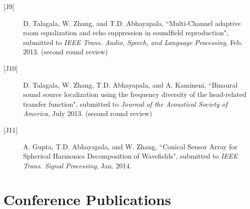\documentclass[11pt]{article}
\begin{document}
\begin{description}
\item[{[}J9{]}]D. Talagala, W. Zhang, and T.D. Abhayapala, ``Multi-Channel adaptive room equalization and echo suppression in soundfield reproduction", submitted to {\em IEEE Trans. Audio, Speech, and Language Processing}, Feb. 2013. (second round review)

\item[{[}J10{]}]D. Talagala, W. Zhang, T.D. Abhayapala, and A. Kamineni, ``Binaural sound source localization using the frequency diversity of the head-related transfer function", submitted to {\em Journal of the Acoustical Society of America}, July 2013. (second round review)

\item[{[}J11{]}]A. Gupta, T.D. Abhayapala, and W. Zhang, ``Conical Sensor Array for Spherical Harmonics Decomposition of Wavefields", submitted to {\em IEEE Trans. Signal Processing}, Jan. 2014.

\end{description}

\section*{Conference Publications}
\end{document}
